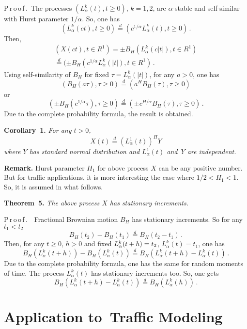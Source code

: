\begin{multicols}{2}
\smallskip

\noindent
P\,r\,o\,o\,f\,.\  The processes $(L_{\alpha}^k (t), t\geq 0)$, $k=1,2$, 
are $\alpha$-stable 
and self-similar with Hurst parameter $1/\alpha$. So, one has
$$
(L_{\alpha}^k (ct), t\geq 0) \stackrel{d}{=} 
(c^{1/\alpha} L_{\alpha}^k (t), t\geq 0) \,.
$$
Then, 
\begin{multline*}
(X(ct) , t\in R^1 ) = \pm B_H (L_{\alpha}^k (c|t|), t\in R^1 ) \\
{}\stackrel{d}{=} 
(\pm B_H (c^{1/\alpha} L_{\alpha}^k (|t|) , t\in R^1 ) \,.
\end{multline*}
Using self-similarity of $B_H$ for fixed 
$\tau = L_{\alpha}^k (|t|)$, for any $a>0$, one has
$$
(B_H (a\tau ), \tau\geq 0) \stackrel{d}{=} (a^H  B_H (\tau), \tau\geq 0) 
$$
or 
$$
(\pm B_H (c^{1/\alpha} \tau ), \tau\geq 0) \stackrel{d}{=} 
(\pm c^{H/\alpha} B_H (\tau), \tau\geq 0) \,. 
$$
Due to the complete probability formula, the result is obtained. 

\smallskip

\noindent
\textbf{Corollary~1.} \textit{For any $t>0$, 
$$
X(t) \stackrel{d}{=} (L_{\alpha}^1 (t))^H  Y
$$
where $Y$ has standard normal distribution and $L_{\alpha}^1 (t)$ and~$Y$ are 
independent.} 

\smallskip

\noindent
\textbf{Remark.} Hurst parameter $H_1$ for above process $X$ can be any positive 
number. But for traffic applications, it is more interesting the case where 
$1/2 <H_1 <1$. So, it is assumed in what follows. 

\smallskip

\noindent
\textbf{Theorem~5.} 
\textit{The above process $X$ has stationary increments.}

\smallskip

\noindent
P\,r\,o\,o\,f\,.\ \ Fractional Brownian motion $B_H$ has stationary increments. So for any 
$t_1 < t_2 $
$$
B_H (t_2 ) - B_H (t_1 ) \stackrel{d}{=} B_H (t_2 - t_1 ) \,. 
$$ 
Then, for any $t\geq 0$, $h>0$ and fixed $L_{\alpha}^k (t+h)\hm = t_2$, 
$L_{\alpha}^k (t) = t_1$, one has 
$$
B_H (L_{\alpha}^k (t+h)) - B_H (L_{\alpha}^k (t)) \stackrel{d}{=} 
B_H (L_{\alpha}^k (t+h) -  L_{\alpha}^k (t)) \,. 
$$ 
Due to the complete probability formula, one has the same for random moments of time. 
The process $L_{\alpha}^k (t)$ has stationary increments too. So, one gets  
$$
B_H (L_{\alpha}^k (t+h) -  L_{\alpha}^k (t))  
\stackrel{d}{=} 
B_H (L_{\alpha}^k (h) ) \,.
$$ 


\section{Application to~Traffic Modeling} 


\end{multicols}
